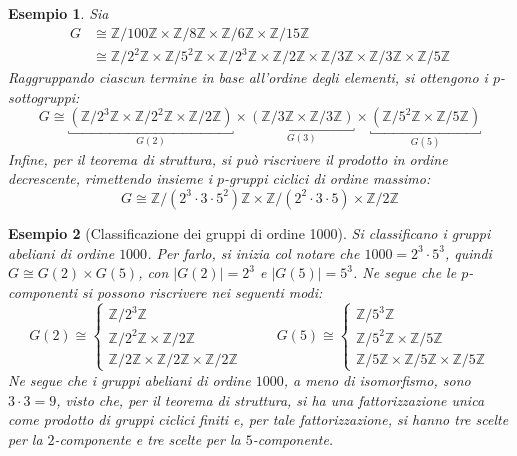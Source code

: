 \documentclass[12pt]{scrartcl}
\theoremstyle{style}
\newtheorem{esempio}{Esempio}[section]
\numberwithin{equation}{subsection}
\begin{document}
\begin{esempio}
	Sia 
	\[
		\begin{split}
			G &\cong \mathbb{Z}/100\mathbb{Z} \times \mathbb{Z}/8\mathbb{Z} \times \mathbb{Z}/6\mathbb{Z} \times  \mathbb{Z}/15\mathbb{Z}\\
			  &\cong \mathbb{Z}/2^2\mathbb{Z} \times \mathbb{Z}/5^2\mathbb{Z}\times \mathbb{Z}/2^3 \mathbb{Z}\times \mathbb{Z}/2\mathbb{Z} \times \mathbb{Z}/3\mathbb{Z}\times \mathbb{Z}/3\mathbb{Z}\times \mathbb{Z}/5\mathbb{Z}
		\end{split}
	\] 
	Raggruppando ciascun termine in base all'ordine degli elementi, si ottengono i $p$-sottogruppi:
	\[
		G\cong \underbracket{\left(\mathbb{Z}/2^3 \mathbb{Z}\times \mathbb{Z}/2^2\mathbb{Z} \times \mathbb{Z}/2\mathbb{Z}\right)}_{G(2)}  \times \underbracket{\left(\mathbb{Z}/3\mathbb{Z} \times \mathbb{Z}/3\mathbb{Z}\right) }_{G(3)} \times \underbracket{\left(\mathbb{Z}/5^2 \mathbb{Z} \times \mathbb{Z}/5\mathbb{Z}\right) }_{G(5)} 
	\] 
	Infine, per il teorema di struttura, si pu\`o riscrivere il prodotto in ordine decrescente, rimettendo insieme i $p$-gruppi ciclici di ordine massimo:
	\[
	G\cong \mathbb{Z}/\left(2^3 \cdot 3\cdot 5^{2}\right) \mathbb{Z} \times \mathbb{Z}/\left(2^2 \cdot 3\cdot 5\right) \times \mathbb{Z}/2\mathbb{Z}
	\] 
\end{esempio}
\begin{esempio}
	[Classificazione dei gruppi di ordine 1000]
Si classificano i gruppi abeliani di ordine $1000$.
Per farlo, si inizia col notare che $1000 = 2^3 \cdot 5^3$, quindi $G \cong G(2) \times G(5)$, con $\lvert G(2) \rvert = 2^3$ e $\lvert G(5) \rvert =5^3$.
Ne segue che le $p$-componenti si possono riscrivere nei seguenti modi:
\[
G(2) \cong \begin{cases}
	\mathbb{Z}/2^3\mathbb{Z}\\
	\mathbb{Z}/2^2 \mathbb{Z} \times \mathbb{Z}/2\mathbb{Z}\\
	\mathbb{Z}/2\mathbb{Z} \times \mathbb{Z}/2\mathbb{Z} \times \mathbb{Z}/2\mathbb{Z}
\end{cases}\hspace{1cm}G(5) \cong \begin{cases}
	\mathbb{Z}/5^3\mathbb{Z}\\
	\mathbb{Z}/5^2 \mathbb{Z} \times \mathbb{Z}/5\mathbb{Z}\\
	\mathbb{Z}/5\mathbb{Z} \times \mathbb{Z}/5\mathbb{Z} \times \mathbb{Z}/5\mathbb{Z}
\end{cases}
\] 
Ne segue che i gruppi abeliani di ordine $1000$, a meno di isomorfismo, sono $3\cdot 3 = 9$, visto che, per il teorema di struttura, si ha una fattorizzazione unica come prodotto di gruppi ciclici finiti e, per tale fattorizzazione, si hanno tre scelte per la $2$-componente e tre scelte per la $5$-componente.
\end{esempio}
\end{document}
